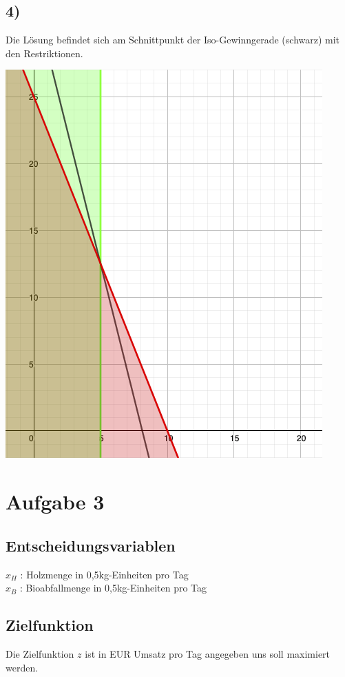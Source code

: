 \documentclass[a4paper,11pt]{article}
\begin{document}
\subsection*{4)}
Die Lösung befindet sich am Schnittpunkt der Iso-Gewinngerade (schwarz) mit den Restriktionen. \newline

\begin{centering}
	\includegraphics[width=.7\linewidth]{src/a2_4.png}
\end{centering}

\section*{Aufgabe 3}

\subsection*{Entscheidungsvariablen}
$x_H$ : Holzmenge in 0,5kg-Einheiten pro Tag \\
$x_B$ : Bioabfallmenge in 0,5kg-Einheiten pro Tag \\

\subsection*{Zielfunktion}
Die Zielfunktion $z$ ist in EUR Umsatz pro Tag angegeben uns soll maximiert werden. \\
\end{document}

